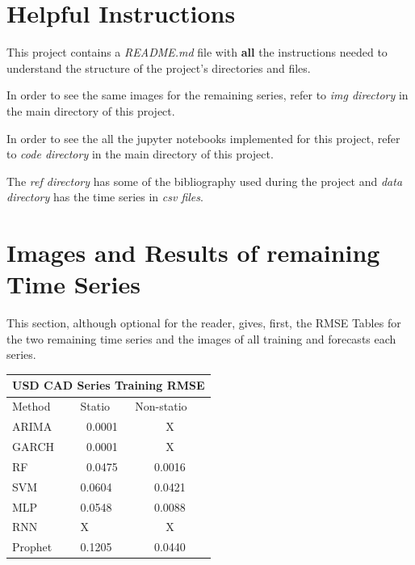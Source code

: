 \documentclass[10pt,twocolumn,letterpaper]{article}
\begin{document}
	\section{Helpful Instructions }
	
	This project contains a \textit{README.md} file with \textbf{all} the instructions needed to understand the structure of the project's directories and files.
	
	In order to see the same images for the remaining series, refer to \textit{img directory} in the main directory of this project.
	
	In order to see the all the jupyter notebooks implemented for this project, refer to \textit{code directory} in the main directory of this project.
	
	The \textit{ref directory} has some of the bibliography used during the project and \textit{data directory} has the time series in \textit{csv files}.
	
	\section{Images and Results of remaining Time Series}
	
	This section, although optional for the reader, gives, first, the RMSE Tables for the two remaining time series and the images of all training and forecasts each series.
	
	
	\begin{table}[h]\label{table:usdcadtrainingRMSE}
		\centering
		\begin{tabular}{|lll|}
			\hline
			\multicolumn{3}{|c|}{USD CAD Series Training RMSE}                                                  \\ \hline
			\multicolumn{1}{|l|}{Method}  & \multicolumn{1}{l|}{Statio} & Non-statio             \\ \hline
			\multicolumn{1}{|l|}{ARIMA}   & \multicolumn{1}{c|}{0.0001}       & \multicolumn{1}{c|}{X} \\ \hline
			\multicolumn{1}{|l|}{GARCH}   & \multicolumn{1}{c|}{0.0001}       & \multicolumn{1}{c|}{X} \\ \hline
			\multicolumn{1}{|l|}{RF}      & \multicolumn{1}{c|}{0.0475}       & \multicolumn{1}{c|}{0.0016}  \\ \hline
			\multicolumn{1}{|l|}{SVM}     & \multicolumn{1}{l|}{0.0604}       & \multicolumn{1}{c|}{0.0421}  \\ \hline
			\multicolumn{1}{|l|}{MLP}     & \multicolumn{1}{l|}{0.0548}       & \multicolumn{1}{c|}{0.0088}  \\ \hline
			\multicolumn{1}{|l|}{RNN}     & \multicolumn{1}{l|}{X}       & \multicolumn{1}{c|}{X}  \\ \hline
			\multicolumn{1}{|l|}{Prophet} & \multicolumn{1}{l|}{0.1205}       & \multicolumn{1}{c|}{0.0440}  \\ \hline
		\end{tabular}
	\end{table}
	
\end{document}
